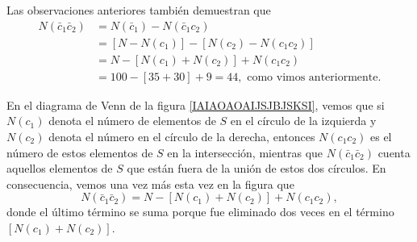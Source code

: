 \begin{myexample}
    Las observaciones anteriores también demuestran que
    \begin{align*}
        N(\bar{c}_1 \bar{c}_2) & = N(\bar{c}_1) - N(\bar{c}_1 c_2) \\
        & = [N - N(c_1)] - [N(c_2) - N(c_1c_2)] \\
        & = N - [N(c_1) + N(c_2)] + N(c_1 c_2) \\
        & = 100 - [35 + 30] + 9 = 44, \text{ como vimos anteriormente.}
    \end{align*}
    \begin{minipage}[l]{0.6\textwidth}
        En el diagrama de Venn de la figura \ref{IAIAOAOAIJSJBJSKSI}, vemos que si $N(c_1)$ denota el número de elementos de $S$ en el círculo de la izquierda y $N(c_2)$ denota el número en el círculo de la derecha, entonces $N(c_1 c_2)$ es el número de estos elementos de $S$ en la intersección, mientras que $N(\bar{c}_1 \bar{c}_2)$ cuenta aquellos elementos de $S$ que están fuera de la unión de estos dos círculos. En consecuencia, vemos una vez más esta vez en la figura que
        $$N(\bar{c}_1 \bar{c}_2) = N - [N(c_1) + N(c_2)] + N(c_1 c_2),$$
        donde el último término se suma porque fue eliminado dos veces en el término $[N(c_1) + N(c_2)]$.
    \end{minipage}~
    \begin{minipage}[r]{0.22\textwidth}
        \begin{center}
             \label{IAIAOAOAIJSJBJSKSI}
        \end{center}
    \end{minipage}
\end{myexample}

\newpage

